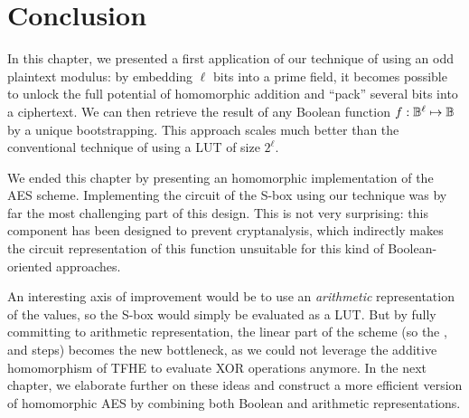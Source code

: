 \section{Conclusion}

In this chapter, we presented a first application of our technique of using an odd plaintext modulus: by embedding $\ell$ bits into a prime field, it becomes possible to unlock the full potential of homomorphic addition and ``pack'' several bits into a ciphertext. We can then retrieve the result of any Boolean function $f:\mathbb{B}^\ell \mapsto \mathbb{B}$ by a unique bootstrapping. This approach scales much better than the conventional technique of using a LUT of size $2^\ell$.

We ended this chapter by presenting an homomorphic implementation of the AES scheme. Implementing the circuit of the S-box using our technique was by far the most challenging part of this design. This is not very surprising: this component has been designed to prevent cryptanalysis,  which indirectly makes the circuit representation of this function unsuitable for this kind of Boolean-oriented approaches.

An interesting axis of improvement would be to use an \textit{arithmetic} representation of the values, so the S-box would simply be evaluated as a LUT. But by fully committing to arithmetic representation, the linear part of the scheme (so the \ShiftRows, \MixColumns and \AddRoundKey steps) becomes the new bottleneck, as we could not leverage the additive homomorphism of TFHE to evaluate XOR operations anymore. In the next chapter, we elaborate further on these ideas and construct a more efficient version of homomorphic AES by combining both Boolean and arithmetic representations. 

